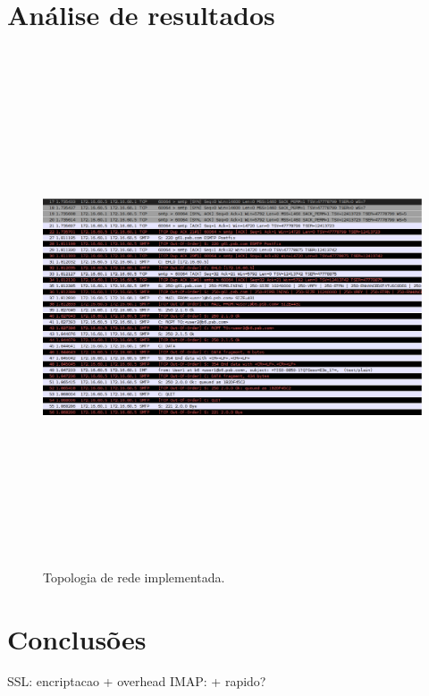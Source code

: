 \documentclass[a4paper,12pt]{article}
\begin{document}
\section{Análise de resultados}

\begin{figure}[htp]
	\begin{center}
		\includegraphics[height=6in]{screenshots/sessao1_smtp}
	\end{center}
	\caption{Topologia de rede implementada.}
	\label{fig:topologia}
\end{figure}

\section{Conclusões}
SSL: encriptacao + overhead
IMAP: + rapido?
\end{document}
